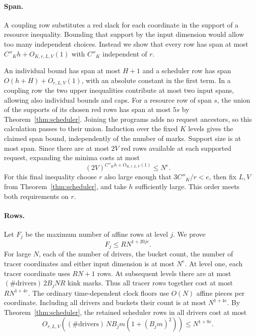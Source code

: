\paragraph{Span.}
A coupling row substitutes a red slack for each coordinate in the support
of a resource inequality. Bounding that support by the input dimension
would allow too many independent choices. Instead we show that every row
has span at most $C''_K h+O_{K,r,L,V}(1)$ with $C''_K$ independent of $r$.

An individual bound has span at most $H+1$ and a scheduler row has span
$O(h+H)+O_{r,L,V}(1)$, with an absolute constant in the first term.
In a coupling row the two upper inequalities contribute at most two input
spans, allowing also individual bounds and caps. For a resource row of
span $s$, the union of the supports of its chosen red rows has span at
most $5s$ by Theorem~\ref{thm:scheduler}. Joining the programs adds no
request ancestors, so this calculation passes to their union. Induction
over the fixed $K$ levels gives the claimed span bound, independently of
the number of marks. Support size is at most span. Since there are at
most $2V$ red rows available at each supported request, expanding the
minima costs at most
\[
        (2V)^{C''_K h+O_{K,r,L,V}(1)} \le N^e .
\]
For this final inequality choose $r$ also large enough that $3C''_K/r<e$,
then fix $L,V$ from Theorem~\ref{thm:scheduler}, and take $h$ sufficiently
large. This order meets both requirements on $r$.

\paragraph{Rows.}
Let $F_j$ be the maximum number of affine rows at level $j$. We prove
\[
                     F_j\le R N^{1+20je}.
\]
For large $N$, each of the number of drivers, the bucket count, the number
of tracer coordinates and either input dimension is at most $N^e$. At
level one, each tracer coordinate uses $RN+1$ rows. At subsequent levels
there are at most $(\#\text{drivers})\,2B_j N R$ kink marks. Thus all
tracer rows together cost at most $R N^{1+4e}$. The ordinary
time-dependent clock floors use $O(N)$ affine pieces per coordinate.
Including all drivers and buckets their count is at most $N^{1+4e}$.
By Theorem~\ref{thm:scheduler}, the retained scheduler rows in all
drivers cost at most
\[
 O_{r,L,V}\!\left((\#\text{drivers})\,N B_j m
                         (1+(B_jm)^2)\right)\le N^{1+8e}.
\]

